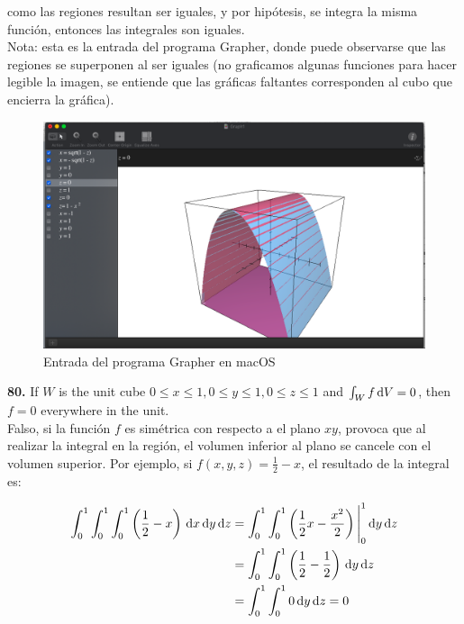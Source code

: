 \documentclass[11pt]{report}
\begin{document}
como las regiones resultan ser iguales, y por hipótesis, se integra la misma
función, entonces las integrales son iguales.\\

Nota: esta es la entrada del programa Grapher, donde puede observarse que
las regiones se superponen al ser iguales (no graficamos algunas funciones
para hacer legible la imagen, se entiende que las gráficas faltantes
corresponden al cubo que encierra la gráfica).

\begin{figure}[H]
	\includegraphics[scale=0.3]{grapher.png}
	\centering
	\caption{Entrada del programa Grapher en macOS}
	\centering
\end{figure}

\textbf{80.} If $W$ is the unit cube $0 \leq x \leq 1, 0 \leq y \leq 1, 0 \leq z \leq 1$
and $ \int _W f \, \text dV = 0$, then $f = 0$ everywhere in the unit. \\

Falso, si la función $f$ es simétrica con respecto a el plano $xy$, provoca que al
realizar la integral en la región, el volumen inferior al plano se cancele con el
volumen superior. Por ejemplo, si $f(x,y,z) = \frac{1}{2} - x$, el resultado
de la integral es:

\begin{equation}
\begin{split}
        \int_0^1 \int_0^1 \int_0^1 \left( \frac{1}{2} - x \right) \, \text dx \, \text dy \, \text dz
        &= \int_0^1 \int_0^1 \left( \frac{1}{2}x - \frac{x^2}{2} \right) \Bigg|_0^1 \, \text dy \, \text dz \\ \notag
        &= \int_0^1 \int_0^1 \left( \frac{1}{2} - \frac{1}{2} \right) \, \text dy \, \text dz \\ \notag
        &= \int_0^1 \int_0^1 0 \, \text dy \, \text dz = 0 \\ \notag
\end{split}
\end{equation}
\end{document}
